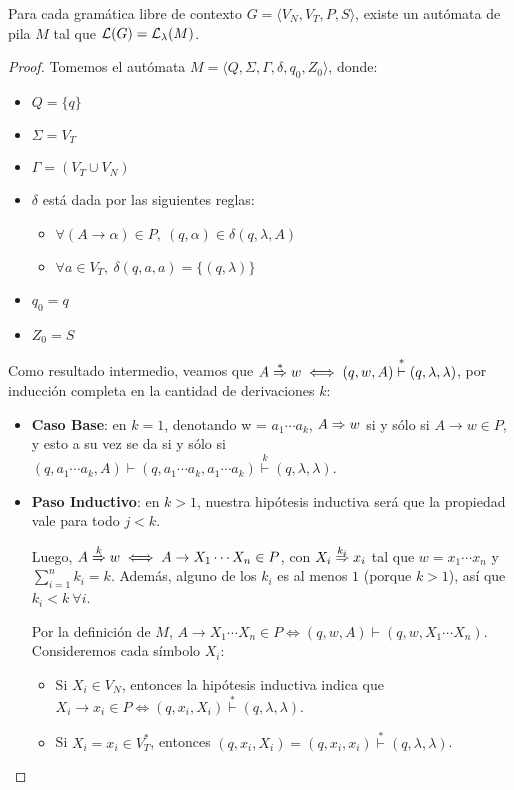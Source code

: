 \begin{theorem*}
    Para cada gramática libre de contexto $G = \langle V_N, V_T, P, S \rangle$, existe un autómata de pila $M$ tal que $\mathcal{L}(G) = \mathcal{L}_\lambda(M)$.
\end{theorem*}
\begin{proof}
    Tomemos el autómata $M = \langle Q, \Sigma, \Gamma, \delta, q_0, Z_0 \rangle$, donde:
    \begin{itemize}
        \item $Q = \{q\}$
        \item $\Sigma = V_T$
        \item $\Gamma = (V_T \cup V_N)$
        \item $\delta$ está dada por las siguientes reglas:
        \begin{itemize}
            \item $\forall (A \to \alpha) \in P, \ (q, \alpha) \in \delta(q, \lambda, A)$
            \item $\forall a \in V_T,\ \delta(q, a, a) = \{(q, \lambda)\}$
        \end{itemize}
        \item $q_0 = q$
        \item $Z_0 = S$
    \end{itemize}

    Como resultado intermedio, veamos que $A \overset{*}{\Rightarrow} w \iff (q, w, A) \overset{*}{\vdash} (q, \lambda, \lambda)$, por inducción completa en la cantidad de derivaciones $k$:
    \begin{itemize}
        \item \textbf{Caso Base}: en $k = 1$, denotando w = $a_1 \cdots a_k$, $A \Rightarrow w$ si y sólo si $A \to w \in P$, y esto a su vez se da si y sólo si $(q, a_1 \cdots a_k, A) \vdash (q, a_1 \cdots a_k, a_1 \cdots a_k) \overset{k}{\vdash} (q, \lambda, \lambda)$.
        \item \textbf{Paso Inductivo}: en $k > 1$, nuestra hipótesis inductiva será que la propiedad vale para todo $j < k$.
        
            Luego, $A \overset{k}{\Rightarrow} w \iff A \to X_1 \cdots X_n \in P$, con $X_i \overset{k_i}{\Rightarrow} x_i$ tal que $w = x_1 \cdots x_n$ y $\sum_{i = 1}^n k_i = k$. Además, alguno de los $k_i$ es al menos $1$ (porque $k > 1$), así que $k_i < k\ \forall i$.

            Por la definición de $M$, $A \to X_1 \cdots X_n \in P \iff (q, w, A) \vdash (q, w, X_1 \cdots X_n)$. Consideremos cada símbolo $X_i$:
            \begin{itemize}
                \item Si $X_i \in V_N$, entonces la hipótesis inductiva indica que $X_i \to x_i \in P \iff (q, x_i, X_i) \overset{*}{\vdash} (q, \lambda, \lambda)$.
                \item Si $X_i = x_i \in V_T^*$, entonces $(q, x_i, X_i) = (q, x_i, x_i) \overset{*}{\vdash} (q, \lambda, \lambda)$.
            \end{itemize}


\end{itemize}
\end{proof}
